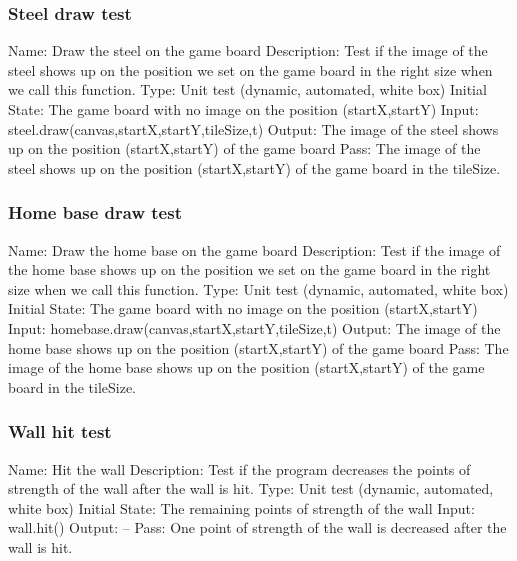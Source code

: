 \documentclass{article}
\begin{document}
\subsubsection{Steel draw test}
Name:  Draw the steel on the game board\newline
Description: Test if the image of the steel shows up on the position we set on 
the game board in the right size when we call this function. \newline
Type: Unit test (dynamic, automated, white box) \newline
Initial State:  The game board with no image on the position (startX,startY) 
\newline
Input: steel.draw(canvas,startX,startY,tileSize,t)\newline
Output: The image of the steel shows up on the position (startX,startY) of the
 game board\newline
Pass:  The image of the steel shows up on the position (startX,startY) of the 
game board in the tileSize. \newline

\subsubsection{Home base draw test}
Name:  Draw the home base on the game board\newline
Description: Test if the image of the home base shows up on the position we 
set on the game board in the right size when we call this function. \newline
Type: Unit test (dynamic, automated, white box) \newline
Initial State:  The game board with no image on the position (startX,startY) 
\newline
Input: homebase.draw(canvas,startX,startY,tileSize,t)\newline
Output: The image of the home base shows up on the position (startX,startY) of
 the game board\newline
Pass:  The image of the home base shows up on the position (startX,startY) of 
the game board in the tileSize. \newline

\subsubsection{Wall hit test}
Name:  Hit the wall\newline
Description: Test if the program decreases the points of strength of the wall 
after the wall is hit. \newline
Type: Unit test (dynamic, automated, white box) \newline
Initial State:  The remaining points of strength of the wall\newline
Input: wall.hit()\newline
Output: --\newline
Pass:  One point of strength of the wall is decreased after the wall is hit. 
\newline
\end{document}
